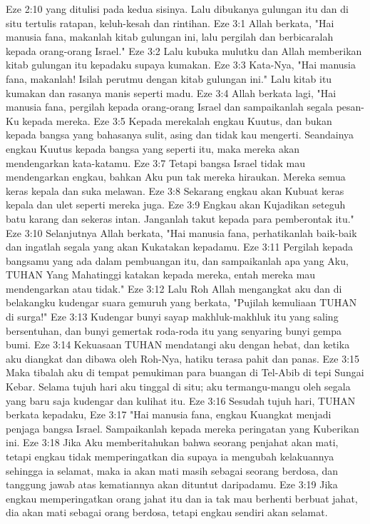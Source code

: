 Eze 2:10  yang ditulisi pada kedua sisinya. Lalu dibukanya gulungan itu dan di situ tertulis ratapan, keluh-kesah dan rintihan.
Eze 3:1  Allah berkata, "Hai manusia fana, makanlah kitab gulungan ini, lalu pergilah dan berbicaralah kepada orang-orang Israel."
Eze 3:2  Lalu kubuka mulutku dan Allah memberikan kitab gulungan itu kepadaku supaya kumakan.
Eze 3:3  Kata-Nya, "Hai manusia fana, makanlah! Isilah perutmu dengan kitab gulungan ini." Lalu kitab itu kumakan dan rasanya manis seperti madu.
Eze 3:4  Allah berkata lagi, "Hai manusia fana, pergilah kepada orang-orang Israel dan sampaikanlah segala pesan-Ku kepada mereka.
Eze 3:5  Kepada merekalah engkau Kuutus, dan bukan kepada bangsa yang bahasanya sulit, asing dan tidak kau mengerti. Seandainya engkau Kuutus kepada bangsa yang seperti itu, maka mereka akan mendengarkan kata-katamu.
Eze 3:7  Tetapi bangsa Israel tidak mau mendengarkan engkau, bahkan Aku pun tak mereka hiraukan. Mereka semua keras kepala dan suka melawan.
Eze 3:8  Sekarang engkau akan Kubuat keras kepala dan ulet seperti mereka juga.
Eze 3:9  Engkau akan Kujadikan seteguh batu karang dan sekeras intan. Janganlah takut kepada para pemberontak itu."
Eze 3:10  Selanjutnya Allah berkata, "Hai manusia fana, perhatikanlah baik-baik dan ingatlah segala yang akan Kukatakan kepadamu.
Eze 3:11  Pergilah kepada bangsamu yang ada dalam pembuangan itu, dan sampaikanlah apa yang Aku, TUHAN Yang Mahatinggi katakan kepada mereka, entah mereka mau mendengarkan atau tidak."
Eze 3:12  Lalu Roh Allah mengangkat aku dan di belakangku kudengar suara gemuruh yang berkata, "Pujilah kemuliaan TUHAN di surga!"
Eze 3:13  Kudengar bunyi sayap makhluk-makhluk itu yang saling bersentuhan, dan bunyi gemertak roda-roda itu yang senyaring bunyi gempa bumi.
Eze 3:14  Kekuasaan TUHAN mendatangi aku dengan hebat, dan ketika aku diangkat dan dibawa oleh Roh-Nya, hatiku terasa pahit dan panas.
Eze 3:15  Maka tibalah aku di tempat pemukiman para buangan di Tel-Abib di tepi Sungai Kebar. Selama tujuh hari aku tinggal di situ; aku termangu-mangu oleh segala yang baru saja kudengar dan kulihat itu.
Eze 3:16  Sesudah tujuh hari, TUHAN berkata kepadaku,
Eze 3:17  "Hai manusia fana, engkau Kuangkat menjadi penjaga bangsa Israel. Sampaikanlah kepada mereka peringatan yang Kuberikan ini.
Eze 3:18  Jika Aku memberitahukan bahwa seorang penjahat akan mati, tetapi engkau tidak memperingatkan dia supaya ia mengubah kelakuannya sehingga ia selamat, maka ia akan mati masih sebagai seorang berdosa, dan tanggung jawab atas kematiannya akan dituntut daripadamu.
Eze 3:19  Jika engkau memperingatkan orang jahat itu dan ia tak mau berhenti berbuat jahat, dia akan mati sebagai orang berdosa, tetapi engkau sendiri akan selamat.
